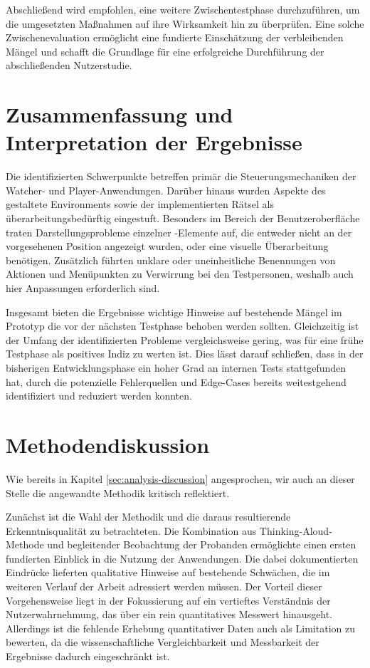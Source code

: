Abschließend wird empfohlen, eine weitere Zwischentestphase durchzuführen, um die umgesetzten Maßnahmen auf ihre Wirksamkeit hin zu überprüfen. Eine solche Zwischenevaluation ermöglicht eine fundierte Einschätzung der verbleibenden Mängel und schafft die Grundlage für eine erfolgreiche Durchführung der abschließenden Nutzerstudie.

\section{Zusammenfassung und Interpretation der Ergebnisse}

Die identifizierten Schwerpunkte betreffen primär die Steuerungsmechaniken der Watcher- und Player-Anwendungen. Darüber hinaus wurden Aspekte des gestaltete Environments sowie der implementierten Rätsel als überarbeitungsbedürftig eingestuft. Besonders im Bereich der Benutzeroberfläche traten Darstellungsprobleme einzelner -Elemente auf, die entweder nicht an der vorgesehenen Position angezeigt wurden, oder eine visuelle Überarbeitung benötigen. Zusätzlich führten unklare oder uneinheitliche Benennungen von Aktionen und Menüpunkten zu Verwirrung bei den Testpersonen, weshalb auch hier Anpassungen erforderlich sind.

Insgesamt bieten die Ergebnisse wichtige Hinweise auf bestehende Mängel im Prototyp die vor der nächsten Testphase behoben werden sollten. Gleichzeitig ist der Umfang der identifizierten Probleme vergleichsweise gering, was für eine frühe Testphase als positives Indiz zu werten ist. Dies lässt darauf schließen, dass in der bisherigen Entwicklungsphase ein hoher Grad an internen Tests stattgefunden hat, durch die potenzielle Fehlerquellen und Edge-Cases bereits weitestgehend identifiziert und reduziert werden konnten.

\section{Methodendiskussion}

Wie bereits in Kapitel \ref{sec:analysis-discussion} angesprochen, wir auch an dieser Stelle die angewandte Methodik kritisch reflektiert.

Zunächst ist die Wahl der Methodik und die daraus resultierende Erkenntnisqualität zu betrachteten. Die Kombination aus Thinking-Aloud-Methode und begleitender Beobachtung der Probanden ermöglichte einen ersten fundierten Einblick in die Nutzung der Anwendungen. Die dabei dokumentierten Eindrücke lieferten qualitative Hinweise auf bestehende Schwächen, die im weiteren Verlauf der Arbeit adressiert werden müssen. Der Vorteil dieser Vorgehensweise liegt in der Fokussierung auf ein vertieftes Verständnis der Nutzerwahrnehmung, das über ein rein quantitatives Messwert hinausgeht. Allerdings ist die fehlende Erhebung quantitativer Daten auch als Limitation zu bewerten, da die wissenschaftliche Vergleichbarkeit und Messbarkeit der Ergebnisse dadurch eingeschränkt ist.

